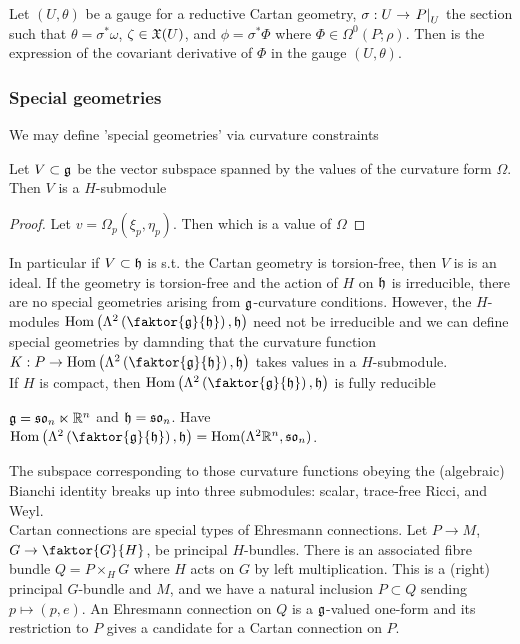 \documentclass{article}
\begin{document}
\begin{prop}
	Let $(U,\theta)$ be a gauge for a reductive Cartan geometry, $\sigma : U \to \left. P \right\rvert_{U}$ the section such that $\theta = \sigma^\ast \omega$, $\zeta \in \mathfrak{X}(U)$, and $\phi = \sigma^\ast \Phi$ where $\Phi \in \Omega^0(P;\rho)$. Then 
	is the expression of the covariant derivative of $\Phi$ in the gauge $(U,\theta)$. 
\end{prop}

\subsubsection{Special geometries}

We may define 'special geometries' via curvature constraints 

\begin{lemma}
	Let $V \subset \mathfrak{g}$ be the vector subspace spanned by the values of the curvature form $\Omega$. Then $V$ is a $H$-submodule
\end{lemma}
\begin{proof}
	Let $v = \Omega_p(\xi_p,\eta_p)$. Then 
	which is a value of $\Omega$
\end{proof}

In particular if $V \subset \mathfrak{h}$ is s.t. the Cartan geometry is torsion-free, then $V$ is is an ideal. If the geometry is torsion-free and the action of $H$ on $\mathfrak{h}$ is irreducible, there are no special geometries arising from $\mathfrak{g}$-curvature conditions. However, the $H$-modules $\Hom\pround{\Lambda^2 \pround{\faktor{\mf{g}}{\mf{h}}},\mf{h}}$ need not be irreducible and we can define special geometries by damnding that the curvature function $K : P \to \Hom\pround{\Lambda^2 \pround{\faktor{\mf{g}}{\mf{h}}},\mf{h}}$ takes values in a $H$-submodule. \\
If $H$ is compact, then $\Hom\pround{\Lambda^2 \pround{\faktor{\mf{g}}{\mf{h}}},\mf{h}}$ is fully reducible
\begin{example}
	$\mathfrak{g} = \mathfrak{so}_n \ltimes \mathbb{R}^n$ and $\mathfrak{h} = \mathfrak{so}_n$. Have $\Hom\pround{\Lambda^2 \pround{\faktor{\mf{g}}{\mf{h}}},\mf{h}} = \Hom(\Lambda^2 \mbb{R}^n,\mf{so}_n)$. 
\end{example}
The subspace corresponding to those curvature functions obeying the (algebraic) Bianchi identity breaks up into three submodules: scalar, trace-free Ricci, and Weyl. \\
Cartan connections are special types of Ehresmann connections. Let $P \to M$, $G \to \faktor{G}{H}$, be principal $H$-bundles. There is an associated fibre bundle $Q = P\times_H G$ where $H$ acts on $G$ by left multiplication. This is a (right) principal $G$-bundle and $M$, and we have a natural inclusion $P \subset Q$ sending $p \mapsto (p,e)$. An Ehresmann connection on $Q$ is a $\mathfrak{g}$-valued one-form and its restriction to $P$ gives a candidate for a Cartan connection on $P$.
\end{document}
